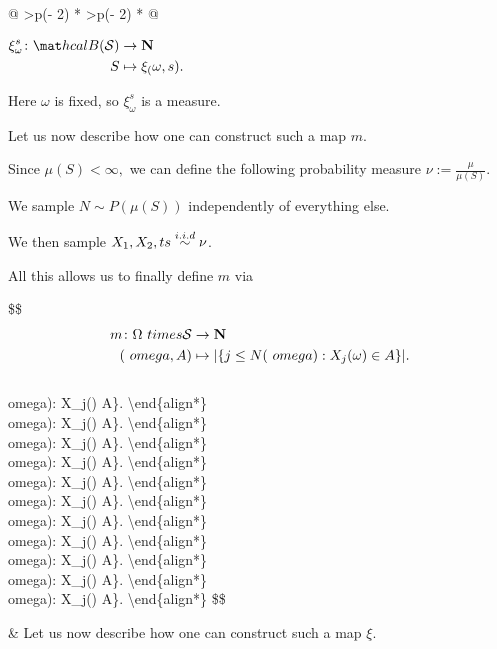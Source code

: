 \documentclass[
  letterpaper,
  DIV=11,
  numbers=noendperiod]{scrartcl}
\begin{document}
\begin{longtable}[]{@{}
  >{\centering\arraybackslash}p{(\columnwidth - 2\tabcolsep) * }
  >{\centering\arraybackslash}p{(\columnwidth - 2\tabcolsep) * }@{}}
{\(
\begin{align*}
\xi_\omega^s\colon \mat
h
c
al B(\mathcal{S}) &\rightarrow \bf N\\
S&\mapsto \xi_(\omega, s).
\end{align*}
\)

Here \(\omega\) is fixed, so \(\xi_\omega^s\) is a measure. \\
\begin{minipage}[t]{\linewidth}\centering
Let us now describe how one can construct such a map \(m\).

Since \(\mu(S) < \infty,\) we can define the following probability
measure \(\nu := \frac{\mu}{\mu(S)}.\)

We sample \(N \sim P(\mu(S))\) independently of everything else.

We then sample \(X_1, X_2, \do
t
s
 \stackrel{i.i.d}{\sim} \nu\).

All this allows us to finally define \(m\) via

\$\$ \begin{align*}
m\colon \Omega

\
times \mathcal{S}&\rightarrow \bf N\\
(
\
omega, A)&\mapsto |\{j \leq N
(
): X_j(\omega) \in A\}|.
\end{align*}\\
omega): X\_j(\omega) \in A\}\textbar. \textbackslash end\{align*\}\\
omega): X\_j(\omega) \in A\}\textbar. \textbackslash end\{align*\}\): X\_j(\omega) \in A\}\textbar. \textbackslash end\{align*\}\\
omega): X\_j(\omega) \in A\}\textbar. \textbackslash end\{align*\}\\
omega): X\_j(\omega) \in A\}\textbar. \textbackslash end\{align*\}\\
omega): X\_j(\omega) \in A\}\textbar. \textbackslash end\{align*\}\\
omega): X\_j(\omega) \in A\}\textbar. \textbackslash end\{align*\}\\
omega): X\_j(\omega) \in A\}\textbar. \textbackslash end\{align*\}\\
omega): X\_j(\omega) \in A\}\textbar. \textbackslash end\{align*\}\\
omega): X\_j(\omega) \in A\}\textbar. \textbackslash end\{align*\}\\
omega): X\_j(\omega) \in A\}\textbar. \textbackslash end\{align*\}
\$\$\strut
\end{minipage} & Let us now describe how one can construct such a map
\(\xi\).

}
\end{longtable}
\end{document}
